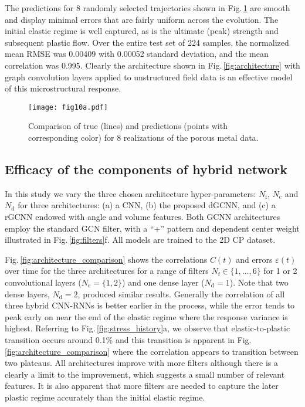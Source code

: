 \documentclass[12pt,reqno]{article}
\newcommand{\ADD}[1]{{#1}}
\newcommand{\fref}[1]{Fig.\,\ref{#1}}
\newcommand{\DGCNN}{{dGCNN}}
\newcommand{\RGCNN}{{rGCNN}}
\newcommand{\error}{\varepsilon}
\newcommand{\corr}{C}
\newcommand{\Nf}{N_\text{f}}
\newcommand{\Nc}{N_\text{c}}
\newcommand{\Nd}{N_\text{d}}
\begin{document}
\ADD{
The predictions for 8 randomly selected trajectories shown in \fref{fig:pore_predictions} are smooth and display minimal errors that are fairly uniform across the evolution.
The initial elastic regime is well captured, as is the ultimate (peak) strength and subsequent plastic flow.
Over the entire test set of 224 samples, the normalized mean RMSE was 0.00409 with 0.00052 standard deviation, and the mean correlation was 0.995.
Clearly the architecture shown in \fref{fig:architecture} with graph convolution layers applied to unstructured field data is an effective model of this microstructural response.
}

\begin{figure}
\centering
{\texttt{[image: fig10a.pdf]}}
\caption{\ADD{Comparison of true (lines) and predictions (points with corresponding color) for 8 realizations of the porous metal data.}
}
\label{fig:pore_predictions}
\end{figure}

\pagebreak

\subsection{Efficacy of the components of hybrid network} \label{sec:components}
In this study we vary the three chosen architecture hyper-parameters: $\Nf$, $\Nc$ and $\Nd$ for three architectures: (a) a CNN, (b) the proposed \DGCNN, and (c) a {\RGCNN} endowed with angle and volume features.
Both GCNN architectures employ the standard GCN filter, with a ``+'' pattern and dependent center weight illustrated in \fref{fig:filters}f.
\ADD{All models are trained to the 2D CP dataset.}

\fref{fig:architecture_comparison} shows the correlations $\corr(t)$ and errors $\error(t)$ over time for the three architectures for a range of filters $\Nf \in \{1,\ldots,6\}$ for 1 or 2 convolutional layers ($\Nc =\{1,2\}$) and one dense layer ($\Nd=1$).
Note that two dense layers, $\Nd=2$, produced similar results.
Generally the correlation of all three hybrid CNN-RNNs is better earlier in the process, while the error tends to peak early on near the end of the elastic regime where the response variance is highest.
Referring to \fref{fig:stress_history}a, we observe that elastic-to-plastic transition occurs around 0.1\% and this transition is apparent in \fref{fig:architecture_comparison} where the correlation appears to transition between two plateaus.
All architectures improve with more filters although there is a clearly a limit to the improvement, which suggests a small number of relevant features.
It is also apparent that more filters are needed to capture the later plastic regime accurately than the initial elastic regime.
\end{document}
